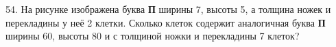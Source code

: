 54. На рисунке изображена буква {\bf П} ширины 7, высоты 5, а толщина ножек и перекладины у неё 2 клетки. Сколько клеток содержит аналогичная буква {\bf П} ширины 60, высоты 80 и с толщиной ножки и перекладины 7 клеток?
\begin{center}
\begin{figure}[ht!]
\end{figure}
\end{center}
